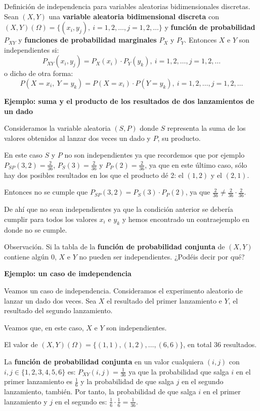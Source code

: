 \documentclass[
  letterpaper,
  DIV=11,
  numbers=noendperiod]{scrreprt}
\begin{document}
Definición de independencia para variables aleatorias bidimensionales
discretas. Sean \((X,Y)\) una \textbf{variable aleatoria bidimensional
discreta} con
\((X,Y)(\Omega)=\{(x_i,y_j),\ i=1,2,\ldots,j=1,2,\ldots\}\) y
\textbf{función de probabilidad} \(P_{XY}\) y \textbf{funciones de
probabilidad marginales} \(P_X\) y \(P_Y\). Entonces \(X\) e \(Y\) son
independientes si: \[
P_{XY}(x_i,y_j)=P_X(x_i)\cdot P_Y(y_k),\ i=1,2,\ldots,j=1,2,\ldots
\] o dicho de otra forma: \[
P(X=x_i,\ Y=y_k)=P(X=x_i)\cdot P(Y=y_k),\ i=1,2,\ldots,j=1,2,\ldots
\]

\textbf{Ejemplo: suma y el producto de los resultados de dos
lanzamientos de un dado}

Consideramos la variable aleatoria \((S,P)\) donde \(S\) representa la
suma de los valores obtenidos al lanzar dos veces un dado y \(P\), su
producto.

En este caso \(S\) y \(P\) no son independientes ya que recordemos que
por ejemplo \(P_{SP}(3,2)=\frac{2}{36}\), \(P_S(3)=\frac{2}{36}\) y
\(P_P(2)=\frac{2}{36}\), ya que en este último caso, sólo hay dos
posibles resultados en los que el producto dé 2: el \((1,2)\) y el
\((2,1)\).

Entonces no se cumple que \(P_{SP}(3,2)=P_S(3)\cdot P_P(2)\), ya que
\(\frac{2}{36}\neq \frac{2}{36}\cdot \frac{2}{36}\).

De ahí que no sean independientes ya que la condición anterior se
debería cumplir para todos los valores \(x_i\) e \(y_k\) y hemos
encontrado un contraejemplo en donde no se cumple.

Observación. Si la tabla de la \textbf{función de probabilidad conjunta}
de \((X,Y)\) contiene algún \(0\), \(X\) e \(Y\) no pueden ser
independientes. ¿Podéis decir por qué?

\textbf{Ejemplo: un caso de imdependencia}

Veamos un caso de independencia. Consideramos el experimento aleatorio
de lanzar un dado dos veces. Sea \(X\) el resultado del primer
lanzamiento e \(Y\), el resultado del segundo lanzamiento.

Veamos que, en este caso, \(X\) e \(Y\) son independientes.

El valor de \((X,Y)(\Omega)=\{(1,1),(1,2),\ldots,(6,6)\}\), en total 36
resultados.

La \textbf{función de probabilidad conjunta} en un valor cualquiera
\((i,j)\) con \(i,j\in\{1,2,3,4,5,6\}\) es: \(P_{XY}(i,j)=\frac{1}{36}\)
ya que la probabilidad que salga \(i\) en el primer lanzamiento es
\(\frac{1}{6}\) y la probabilidad de que salga \(j\) en el segundo
lanzamiento, también. Por tanto, la probabilidad de que salga \(i\) en
el primer lanzamiento y \(j\) en el segundo es:
\(\frac{1}{6}\cdot \frac{1}{6}=\frac{1}{36}.\)
\end{document}
